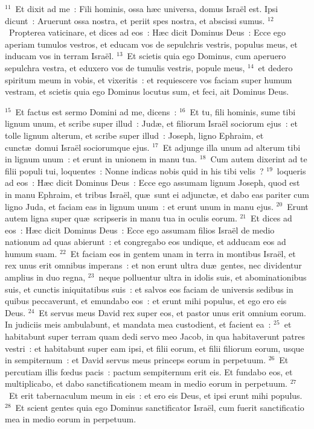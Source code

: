 ${}^{11}$~Et dixit ad me~: Fili hominis, ossa h\ae c universa, domus Isra\"el est. Ipsi dicunt~: Aruerunt ossa nostra, et periit spes nostra, et abscissi sumus.
${}^{12}$~Propterea vaticinare, et dices ad eos~: H\ae c dicit Dominus Deus~: Ecce ego aperiam tumulos vestros, et educam vos de sepulchris vestris, populus meus, et inducam vos in terram Isra\"el.
${}^{13}$~Et scietis quia ego Dominus, cum aperuero sepulchra vestra, et eduxero vos de tumulis vestris, popule meus,
${}^{14}$~et dedero spiritum meum in vobis, et vixeritis~: et requiescere vos faciam super humum vestram, et scietis quia ego Dominus locutus sum, et feci, ait Dominus Deus.


${}^{15}$~Et factus est sermo Domini ad me, dicens~:
${}^{16}$~Et tu, fili hominis, sume tibi lignum unum, et scribe super illud~: Jud\ae , et filiorum Isra\"el sociorum ejus~: et tolle lignum alterum, et scribe super illud~: Joseph, ligno Ephraim, et cunct\ae\ domui Isra\"el sociorumque ejus.
${}^{17}$~Et adjunge illa unum ad alterum tibi in lignum unum~: et erunt in unionem in manu tua.
${}^{18}$~Cum autem dixerint ad te filii populi tui, loquentes~: Nonne indicas nobis quid in his tibi velis~?
${}^{19}$~loqueris ad eos~: H\ae c dicit Dominus Deus~: Ecce ego assumam lignum Joseph, quod est in manu Ephraim, et tribus Isra\"el, qu\ae\ sunt ei adjunct\ae , et dabo eas pariter cum ligno Juda, et faciam eas in lignum unum~: et erunt unum in manu ejus.
${}^{20}$~Erunt autem ligna super qu\ae\ scripseris in manu tua in oculis eorum.
${}^{21}$~Et dices ad eos~: H\ae c dicit Dominus Deus~: Ecce ego assumam filios Isra\"el de medio nationum ad quas abierunt~: et congregabo eos undique, et adducam eos ad humum suam.
${}^{22}$~Et faciam eos in gentem unam in terra in montibus Isra\"el, et rex unus erit omnibus imperans~: et non erunt ultra du\ae\ gentes, nec dividentur amplius in duo regna,
${}^{23}$~neque polluentur ultra in idolis suis, et abominationibus suis, et cunctis iniquitatibus suis~: et salvos eos faciam de universis sedibus in quibus peccaverunt, et emundabo eos~: et erunt mihi populus, et ego ero eis Deus.
${}^{24}$~Et servus meus David rex super eos, et pastor unus erit omnium eorum. In judiciis meis ambulabunt, et mandata mea custodient, et facient ea~:
${}^{25}$~et habitabunt super terram quam dedi servo meo Jacob, in qua habitaverunt patres vestri~: et habitabunt super eam ipsi, et filii eorum, et filii filiorum eorum, usque in sempiternum~: et David servus meus princeps eorum in perpetuum.
${}^{26}$~Et percutiam illis fœdus pacis~: pactum sempiternum erit eis. Et fundabo eos, et multiplicabo, et dabo sanctificationem meam in medio eorum in perpetuum.
${}^{27}$~Et erit tabernaculum meum in eis~: et ero eis Deus, et ipsi erunt mihi populus.
${}^{28}$~Et scient gentes quia ego Dominus sanctificator Isra\"el, cum fuerit sanctificatio mea in medio eorum in perpetuum.


